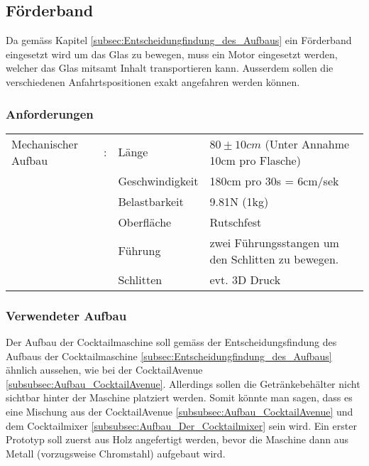 \subsection{Förderband}
\label{subsubsec:Foerderband}

Da gemäss Kapitel \ref{subsec:Entscheidungfindung_des_Aufbaus} ein Förderband eingesetzt wird um das Glas zu bewegen, muss ein Motor eingesetzt werden, welcher das Glas mitsamt Inhalt transportieren kann. Ausserdem sollen die verschiedenen Anfahrtspositionen exakt angefahren werden können. 

\subsubsection{Anforderungen}\label{par:Anforderungen_Foerderband}

\begin{tabularx}{\textwidth}{lllX}
Mechanischer Aufbau & : & Länge & $80\pm10cm$ (Unter Annahme 10cm pro Flasche)\\
 & & Geschwindigkeit & 180cm pro 30s = 6cm/sek \\
 & & Belastbarkeit & 9.81N (1kg) \\
 & & Oberfläche & Rutschfest \\
 & & Führung & zwei Führungsstangen um den Schlitten zu bewegen. \\
 & & Schlitten & evt. 3D Druck \\
\end{tabularx}

\subsubsection{Verwendeter Aufbau}\label{par:Verwendeter_Aufbau}

Der Aufbau der Cocktailmaschine soll gemäss der Entscheidungsfindung des Aufbaus der Cocktailmaschine \ref{subsec:Entscheidungfindung_des_Aufbaus} ähnlich aussehen, wie bei der CocktailAvenue \ref{subsubsec:Aufbau_CocktailAvenue}. Allerdings sollen die Getränkebehälter nicht sichtbar hinter der Maschine platziert werden. Somit könnte man sagen, dass es eine Mischung aus der CocktailAvenue \ref{subsubsec:Aufbau_CocktailAvenue} und dem Cocktailmixer \ref{subsubsec:Aufbau_Der_Cocktailmixer} sein wird. Ein erster Prototyp soll zuerst aus Holz angefertigt werden, bevor die Maschine dann aus Metall (vorzugsweise Chromstahl) aufgebaut wird.